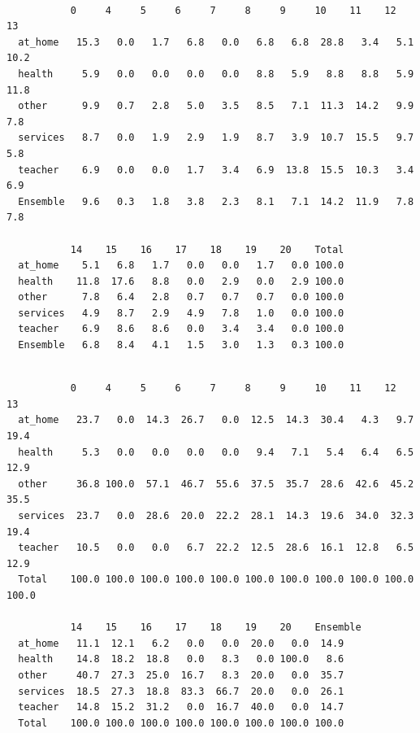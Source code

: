 \documentclass[
  letterpaper,
  DIV=11,
  numbers=noendperiod]{scrartcl}
\newenvironment{Shaded}{\begin{snugshade}}{\end{snugshade}}
\newcommand{\FunctionTok}[1]{\textcolor[rgb]{0.28,0.35,0.67}{#1}}
\newcommand{\NormalTok}[1]{\textcolor[rgb]{0.00,0.23,0.31}{#1}}
\newcommand{\SpecialCharTok}[1]{\textcolor[rgb]{0.37,0.37,0.37}{#1}}
\begin{document}
\begin{verbatim}
          
           0     4     5     6     7     8     9     10    11    12    13   
  at_home   15.3   0.0   1.7   6.8   0.0   6.8   6.8  28.8   3.4   5.1  10.2
  health     5.9   0.0   0.0   0.0   0.0   8.8   5.9   8.8   8.8   5.9  11.8
  other      9.9   0.7   2.8   5.0   3.5   8.5   7.1  11.3  14.2   9.9   7.8
  services   8.7   0.0   1.9   2.9   1.9   8.7   3.9  10.7  15.5   9.7   5.8
  teacher    6.9   0.0   0.0   1.7   3.4   6.9  13.8  15.5  10.3   3.4   6.9
  Ensemble   9.6   0.3   1.8   3.8   2.3   8.1   7.1  14.2  11.9   7.8   7.8
          
           14    15    16    17    18    19    20    Total
  at_home    5.1   6.8   1.7   0.0   0.0   1.7   0.0 100.0
  health    11.8  17.6   8.8   0.0   2.9   0.0   2.9 100.0
  other      7.8   6.4   2.8   0.7   0.7   0.7   0.0 100.0
  services   4.9   8.7   2.9   4.9   7.8   1.0   0.0 100.0
  teacher    6.9   8.6   8.6   0.0   3.4   3.4   0.0 100.0
  Ensemble   6.8   8.4   4.1   1.5   3.0   1.3   0.3 100.0
\end{verbatim}

\begin{Shaded}
\end{Shaded}

\begin{verbatim}
          
           0     4     5     6     7     8     9     10    11    12    13   
  at_home   23.7   0.0  14.3  26.7   0.0  12.5  14.3  30.4   4.3   9.7  19.4
  health     5.3   0.0   0.0   0.0   0.0   9.4   7.1   5.4   6.4   6.5  12.9
  other     36.8 100.0  57.1  46.7  55.6  37.5  35.7  28.6  42.6  45.2  35.5
  services  23.7   0.0  28.6  20.0  22.2  28.1  14.3  19.6  34.0  32.3  19.4
  teacher   10.5   0.0   0.0   6.7  22.2  12.5  28.6  16.1  12.8   6.5  12.9
  Total    100.0 100.0 100.0 100.0 100.0 100.0 100.0 100.0 100.0 100.0 100.0
          
           14    15    16    17    18    19    20    Ensemble
  at_home   11.1  12.1   6.2   0.0   0.0  20.0   0.0  14.9   
  health    14.8  18.2  18.8   0.0   8.3   0.0 100.0   8.6   
  other     40.7  27.3  25.0  16.7   8.3  20.0   0.0  35.7   
  services  18.5  27.3  18.8  83.3  66.7  20.0   0.0  26.1   
  teacher   14.8  15.2  31.2   0.0  16.7  40.0   0.0  14.7   
  Total    100.0 100.0 100.0 100.0 100.0 100.0 100.0 100.0   
\end{verbatim}
\end{document}
